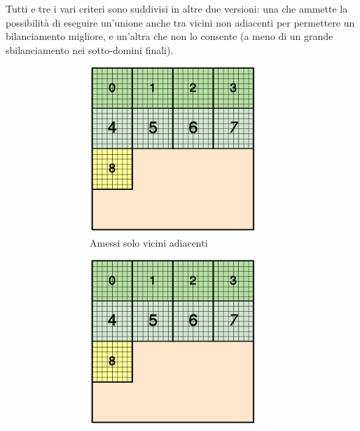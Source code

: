 {Tutti e tre i vari criteri sono suddivisi in altre due versioni: una che ammette la possibilità di eseguire un'unione anche tra vicini non adiacenti per permettere un bilanciamento migliore, e un'altra che non lo consente (a meno di un grande sbilanciamento nei sotto-domini finali).\\
\begin{figure}[H]
	\centering
	\begin{subfigure}{1.0\textwidth}
	\centering
		\begin{subfigure}{0.5\textwidth}
			\centering
			\includegraphics[width=0.9\textwidth]{immagini/block_on_grid.png}
			Amessi solo vicini adiacenti
		\end{subfigure}%
		\begin{subfigure}{0.5\textwidth}
			\centering
			\includegraphics[width=0.9\textwidth]{immagini/block_on_grid.png}

\end{subfigure}
\end{subfigure}
\end{figure}}
